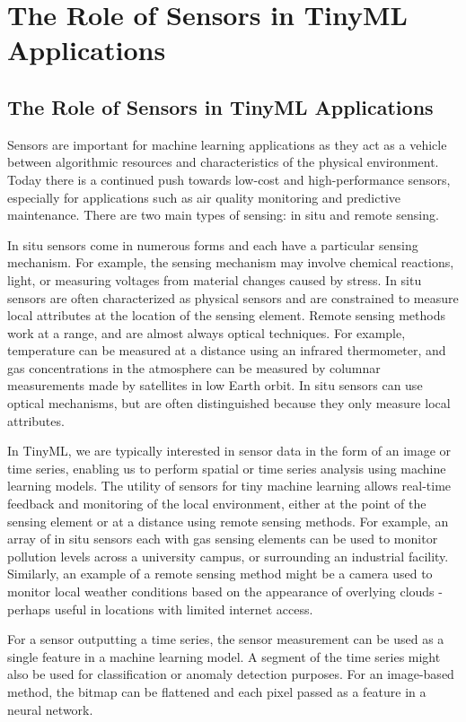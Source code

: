 \section{The Role of Sensors in TinyML Applications}

\subsection{The Role of Sensors in TinyML Applications}

Sensors are important for machine learning applications as they act as a vehicle between algorithmic resources and characteristics of the physical environment. Today there is a continued push towards low-cost and high-performance sensors, especially for applications such as air quality monitoring and predictive maintenance. There are two main types of sensing: in situ and remote sensing. 

In situ sensors come in numerous forms and each have a particular sensing mechanism. For example, the sensing mechanism may involve chemical reactions, light, or measuring voltages from material changes caused by stress. In situ sensors are often characterized as physical sensors and are constrained to measure local attributes at the location of the sensing element. Remote sensing methods work at a range, and are almost always optical techniques. For example, temperature can be measured at a distance using an infrared thermometer, and gas concentrations in the atmosphere can be measured by columnar measurements made by satellites in low Earth orbit. In situ sensors can use optical mechanisms, but are often distinguished because they only measure local attributes.

In TinyML, we are typically interested in sensor data in the form of an image or time series, enabling us to perform spatial or time series analysis using machine learning models. The utility of sensors for tiny machine learning allows real-time feedback and monitoring of the local environment, either at the point of the sensing element or at a distance using remote sensing methods. For example, an array of in situ sensors each with gas sensing elements can be used to monitor pollution levels across a university campus, or surrounding an industrial facility. Similarly, an example of a remote sensing method might be a camera used to monitor local weather conditions based on the appearance of overlying clouds - perhaps useful in locations with limited internet access. 

For a sensor outputting a time series, the sensor measurement can be used as a single feature in a machine learning model. A segment of the time series might also be used for classification or anomaly detection purposes. For an image-based method, the bitmap can be flattened and each pixel passed as a feature in a neural network. 

